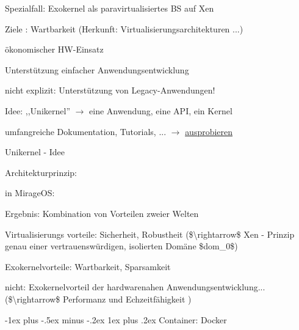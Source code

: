 \documentclass[a4paper]{article}
\makeatletter
\renewcommand{\subsubsection}{\@startsection{subsubsection}{3}{0mm}%
 {-1ex plus -.5ex minus -.2ex}%
 {1ex plus .2ex}%
 {\normalfont\small\bfseries}}
\makeatother
\begin{document}
\begin{multicols}{3}
    \begin{itemize*}
        \item
        Spezialfall: Exokernel als paravirtualisiertes BS auf Xen
        \item
        Ziele : Wartbarkeit (Herkunft: Virtualisierungsarchitekturen ...)
        \begin{itemize*}
            \item ökonomischer HW-Einsatz
            \item Unterstützung einfacher Anwendungsentwicklung
            \item nicht explizit: Unterstützung von Legacy-Anwendungen!
        \end{itemize*}
        \item
        Idee: ,,Unikernel'' $\rightarrow$  eine Anwendung, eine
        API, ein Kernel
        \item
        umfangreiche Dokumentation, Tutorials, ...
        $\rightarrow$
        \href{https://mirage.io/wiki/learning}{ausprobieren}
        \item
        Unikernel - Idee
        \begin{itemize*}
            \item Architekturprinzip: %
            \item in MirageOS: %
        \end{itemize*}
        \item
        Ergebnis: Kombination von Vorteilen zweier Welten
        \begin{itemize*}
            \item Virtualisierungs vorteile: Sicherheit, Robustheit (\$\textbackslash rightarrow\$ Xen - Prinzip genau einer vertrauenswürdigen, isolierten Domäne \$dom\_0\$)
            \item Exokernelvorteile: Wartbarkeit, Sparsamkeit
            \item nicht: Exokernelvorteil der hardwarenahen Anwendungsentwicklung... (\$\textbackslash rightarrow\$ Performanz und Echzeitfähigkeit )
        \end{itemize*}
    \end{itemize*}


    \subsubsection{Container: Docker}


\end{multicols}
\end{document}
